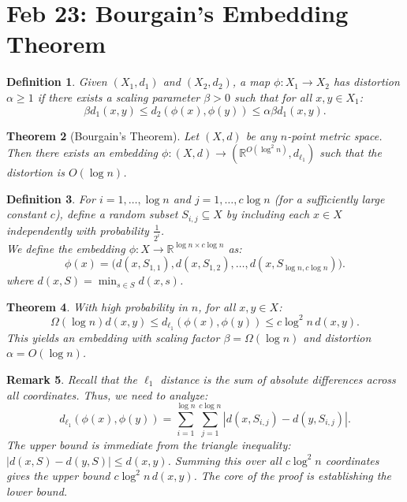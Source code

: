 \documentclass[a4paper]{article}
\newtheorem{thm}{Theorem}[section]
\newtheorem{defn}[thm]{Definition}
\newtheorem{rmk}[thm]{Remark}
\begin{document}
\section{Feb 23: Bourgain's Embedding Theorem}

\begin{defn}
    Given $(X_1,d_1)$ and $(X_2,d_2)$, a map $\phi:X_1\to X_2$ has distortion $\alpha \geq 1$ if there exists a scaling parameter $\beta > 0$ such that for all $x, y \in X_1$:
    \[
        \beta d_1(x,y) \leq d_2(\phi(x),\phi(y)) \leq \alpha \beta d_1(x,y)
    .\]
\end{defn}

\begin{thm}[Bourgain's Theorem]
    Let $(X,d)$ be any $n$-point metric space. Then there exists an embedding $\phi:(X,d)\to (\mathbb{R}^{O(\log^2 n)}, d_{\ell_1})$ such that the distortion is $O(\log n)$.
\end{thm}

\begin{defn}
    For $i=1,\dots,\log n$ and $j=1,\dots,c\log n$ (for a sufficiently large constant $c$), define a random subset $S_{i,j} \subseteq X$ by including each $x\in X$ independently with probability $\frac{1}{2^i}$.\\
    We define the embedding $\phi: X \to \mathbb{R}^{\log n \times c\log n}$ as:
    \[
        \phi(x) = \big( d(x,S_{1,1}), d(x,S_{1,2}), \dots, d(x,S_{\log n, c\log n}) \big)
    .\]
    where $d(x,S) = \min_{s\in S} d(x,s)$.
\end{defn}

\begin{thm}
    With high probability in $n$, for all $x,y\in X$:
    \[
        \Omega(\log n) d(x,y) \leq d_{\ell_1}(\phi(x),\phi(y)) \leq c\log^2 n \, d(x,y)
    .\]
    This yields an embedding with scaling factor $\beta = \Omega(\log n)$ and distortion $\alpha = O(\log n)$.
\end{thm}

\begin{rmk}
    Recall that the $\ell_1$ distance is the sum of absolute differences across all coordinates. Thus, we need to analyze:
    \[
        d_{\ell_1}(\phi(x),\phi(y)) = \sum_{i=1}^{\log n}\sum_{j=1}^{c\log n} \left| d(x,S_{i,j}) - d(y,S_{i,j}) \right|
    .\]
    The upper bound is immediate from the triangle inequality: $|d(x,S) - d(y,S)| \leq d(x,y)$. Summing this over all $c\log^2 n$ coordinates gives the upper bound $c\log^2 n \, d(x,y)$. The core of the proof is establishing the lower bound.
\end{rmk}
\end{document}
